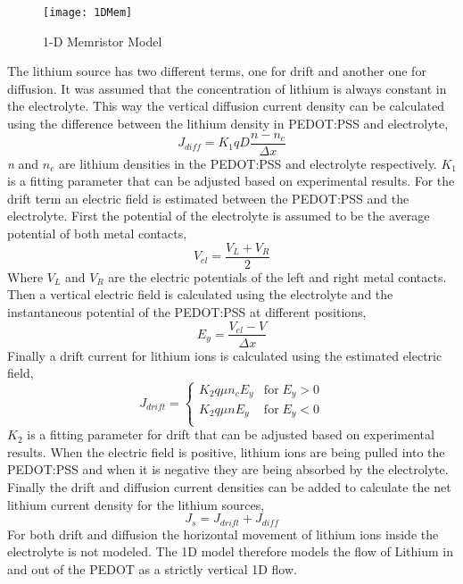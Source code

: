 \begin{doublespace}
 
\begin{figure}[!htp]
\centering
\texttt{[image: 1DMem]}
\caption{1-D Memristor Model} 
\label{MemStc15}
\end{figure}

The lithium source has two different terms, one for drift and another one for diffusion. It was assumed that the concentration of lithium is always constant in the electrolyte. This way the vertical diffusion current density can be calculated using the difference between the lithium density in PEDOT:PSS and electrolyte,
\begin{equation}
J_{diff} = K_1 q D  \frac{n - n_c}{\Delta x}
\end{equation}
\textit{n} and \textit{$n_c$} are lithium densities in the PEDOT:PSS and electrolyte respectively. \textit{$K_1$} is a fitting parameter that can be adjusted based on experimental results. For the drift term an electric field is estimated between the PEDOT:PSS and the electrolyte. First the potential of the electrolyte is assumed to be the average potential of both metal contacts, 
\begin{equation}
V_{el} =  \frac{V_L+V_R}{2}
\end{equation}
Where $V_L $ and $V_R$ are the electric potentials of the left and right metal contacts. Then a vertical electric field is calculated using the electrolyte and the instantaneous potential of the PEDOT:PSS at different positions, 
\begin{equation}
E_{y} =  \frac{V_{el}-V }{\Delta x}
\end{equation}
Finally a drift current for lithium ions is calculated using the estimated electric field, 
\begin{equation}
J_{drift} = \begin{cases}
        K_2 q \mu n_c E_y  & \text{for} \;  E_y>0  \\
        K_2 q \mu n E_y   &  \text{for} \;  E_y<0  \\
     \end{cases}
\end{equation}
\textit{$K_2$} is a fitting parameter for drift that can be adjusted based on experimental results. When the electric field is positive, lithium ions are being pulled into the PEDOT:PSS and when it is negative they are being absorbed by the electrolyte. Finally the drift and diffusion current densities can be added to calculate the net lithium current density for the lithium sources,
\begin{equation}
J_{s} =  J_{drift}+J_{diff}
\end{equation}
For both drift and diffusion the horizontal movement of lithium ions inside the electrolyte is not modeled. The 1D model therefore models the flow of Lithium in and out of the PEDOT as a strictly vertical 1D flow.




\end{doublespace}
